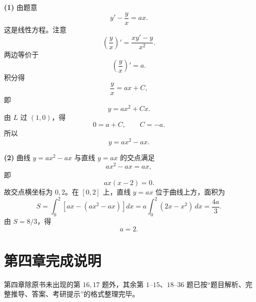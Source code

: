 \begin{solutionblock}
\textbf{(1)} 由题意
\[
y'-\frac{y}{x}=ax.
\]
这是线性方程。注意
\[
\left(\frac{y}{x}\right)'=\frac{xy'-y}{x^2}.
\]
两边等价于
\[
\left(\frac{y}{x}\right)'=a.
\]
积分得
\[
\frac{y}{x}=ax+C,
\]
即
\[
y=ax^2+Cx.
\]
由 \(L\) 过 \((1,0)\)，得
\[
0=a+C,\qquad C=-a.
\]
所以
\[
\boxed{y=ax^2-ax}.
\]

\textbf{(2)} 曲线 \(y=ax^2-ax\) 与直线 \(y=ax\) 的交点满足
\[
ax^2-ax=ax,
\]
即
\[
ax(x-2)=0.
\]
故交点横坐标为 \(0,2\)。在 \([0,2]\) 上，直线 \(y=ax\) 位于曲线上方，面积为
\[
S=\int_0^2\left[ax-(ax^2-ax)\right]dx
=a\int_0^2(2x-x^2)\,dx
=\frac{4a}{3}.
\]
由 \(S=8/3\)，得
\[
\boxed{a=2}.
\]
\end{solutionblock}

\section{第四章完成说明}
第四章除原书未出现的第 \(16,17\) 题外，其余第 \(1\)--\(15\)、\(18\)--\(36\) 题已按“题目解析、完整推导、答案、考研提示”的格式整理完毕。
